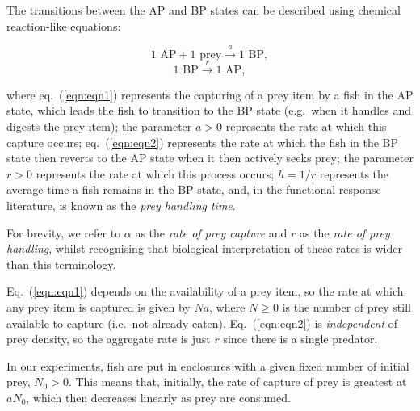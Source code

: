 \documentclass[ASNA,twocolumn]{USG} %
\begin{document}
The transitions between the AP and BP states can be described using chemical reaction-like equations: 

\begin{equation}
\label{eqn:eqn1}
1 \text{ AP} +1 \text{ prey} \xrightarrow{a} 1 \text{ BP},
\end{equation}
\begin{equation}
\label{eqn:eqn2}
1 \text{ BP} \xrightarrow{r} 1 \text{ AP},
\end{equation}

where eq.\ (\ref{eqn:eqn1}) represents the capturing of a prey item by a fish in the AP state, which leads the fish to transition to the BP state (e.g.\ when it handles and digests the prey item); the parameter $a>0$ represents the rate at which this capture occurs; eq.\ (\ref{eqn:eqn2}) represents the rate at which the fish in the BP state then reverts to the AP state when it then actively seeks prey; the parameter \begin{math}r > 0\end{math} represents the rate at which this process occurs; \begin{math} h = 1/r\end{math} represents the average time a fish remains in the BP state, and, in the functional response literature, is known as the \textit{prey handling time}.

For brevity, we refer to \begin{math}\alpha\end{math} as the \textit{rate of prey capture} and \begin{math}r\end{math} as the \textit{rate of prey handling}, whilst recognising that biological interpretation of these rates is wider than this terminology.

Eq.\ (\ref{eqn:eqn1}) depends on the availability of a prey item, so the rate at which any prey item is captured is given by \begin{math} N a\end{math}, where \begin{math} N \geq 0\end{math} is the number of prey still available to capture (i.e.\ not already eaten). Eq.\ (\ref{eqn:eqn2}) is \textit{independent} of prey density, so the aggregate rate is just \begin{math}r\end{math} since there is a single predator.

In our experiments, fish are put in enclosures with a given fixed number of initial prey, \begin{math} N_0 > 0\end{math}. This means that, initially, the rate of capture of prey is greatest at \begin{math} a N_0\end{math}, which then decreases linearly as prey are consumed.
\end{document}
